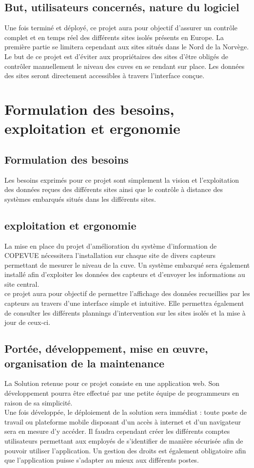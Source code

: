 \subsection{But, utilisateurs concernés, nature du logiciel}
Une fois terminé et déployé, ce projet aura pour objectif d'assurer un contrôle complet et en temps réel des différents sites isolés présents en Europe. La première partie se limitera cependant aux sites situés dans le Nord de la Norvège. Le but de ce projet est d'éviter aux propriétaires des sites d'être obligés de contrôler manuellement le niveau des cuves en se rendant sur place. Les données des sites seront directement accessibles à travers l'interface conçue.

\section{Formulation des besoins, exploitation et ergonomie}
\subsection{Formulation des besoins}
Les besoins exprimés pour ce projet sont simplement la vision et l'exploitation des données reçues des différents sites ainsi que le contrôle à distance des systèmes embarqués situés dans les différents sites.

\subsection{exploitation et ergonomie}
La mise en place du projet d'amélioration du système d'information de COPEVUE nécessitera l'installation sur chaque site de divers capteurs permettant de mesurer le niveau de la cuve. Un système embarqué sera également installé afin d'exploiter les données des capteurs et d'envoyer les informations au site central.\\
ce projet aura pour objectif de permettre l'affichage des données recueillies par les capteurs au travers d'une interface simple et intuitive. Elle permettra également de consulter les différents plannings d'intervention sur les sites isolés et la mise à jour de ceux-ci.

\subsection{Portée, développement, mise en œuvre, organisation de la maintenance}
La Solution retenue pour ce projet consiste en une application web. Son développement pourra être effectué par une petite équipe de programmeurs en raison de sa simplicité.\\
Une fois développée, le déploiement de la solution sera immédiat : toute poste de travail ou plateforme mobile disposant d'un accès à internet et d'un navigateur sera en mesure d'y accéder. Il faudra cependant créer les différents comptes utilisateurs permettant aux employés de s'identifier de manière sécurisée afin de pouvoir utiliser l'application. Un gestion des droits est également obligatoire afin que l'application puisse s'adapter au mieux aux différents postes.

